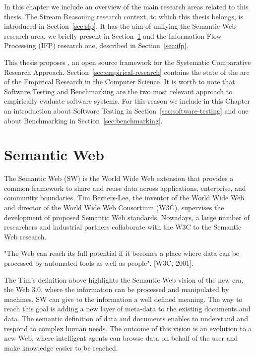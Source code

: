 In this chapter we include an overview of the main research areas related to this thesis. The Stream Reasoning research context, to which this thesis belongs, is introduced in Section~\ref{sec:sfp}. It has the aim of unifying the Semantic Web research area, we briefly present in Section~\ref{sec:sw} and the Information Flow Processing (IFP) research one, described in Section~\ref{sec:ifp}. 

This thesis proposes \namens, an open source framework for the Systematic Comparative Research Approach. Section~\ref{sec:empirical-research} contains the state of the are of the Empirical Research in the Computer Science. It is worth to note that Software Testing and Benchmarking are the two most relevant approach to empirically evaluate software systems. For this reason we include in this Chapter an introduction about Software Testing in Section~\ref{sec:software-testing} and one about Benchmarking in Section~\ref{sec:benchmarking}.

\section{Semantic Web}\label{sec:sw}

The Semantic Web (SW) is the World Wide Web extension  that  provides a common framework to share and reuse data across applications, enterprise, and community boundaries. Tim Berners-Lee, the inventor of the World Wide Web and director of the World Wide Web Consortium (W3C), supervises the development of proposed Semantic Web standards. Nowadays, a large number of researchers and industrial partners collaborate with the W3C to the Semantic Web research.\\
\begin{center}
"The Web can reach its full potential if it becomes a place where data can be processed by automated tools as well as people". [W3C, 2001].
\end{center}

\noindent The Tim's definition above highlights the Semantic Web vision of the new era, the Web 3.0,  where the information can be processed and manipulated by machines. SW can give to the information a well defined meaning. The way to reach this goal is adding a new layer of meta-data to the existing documents and data. The semantic definition of data and documents enables to understand and respond to complex human needs. The outcome of this vision is an evolution to a new Web, where intelligent agents can browse data on behalf of the user and make knowledge easier to be reached.


